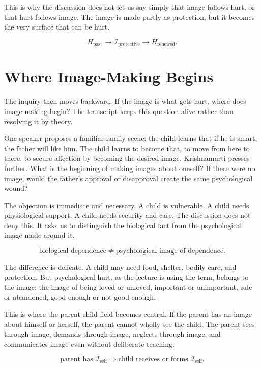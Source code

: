 This is why the discussion does not let us say simply that image follows hurt, or that hurt follows image. The image is made partly as protection, but it becomes the very surface that can be hurt.

\begin{equation}
H_{\text{past}} \to \mathcal{I}_{\text{protective}} \to H_{\text{renewed}}.
\end{equation}

\section{Where Image-Making Begins}

The inquiry then moves backward. If the image is what gets hurt, where does image-making begin? The transcript keeps this question alive rather than resolving it by theory.

One speaker proposes a familiar family scene: the child learns that if he is smart, the father will like him. The child learns to become that, to move from here to there, to secure affection by becoming the desired image. Krishnamurti presses further. What is the beginning of making images about oneself? If there were no image, would the father's approval or disapproval create the same psychological wound?

The objection is immediate and necessary. A child is vulnerable. A child needs physiological support. A child needs security and care. The discussion does not deny this. It asks us to distinguish the biological fact from the psychological image made around it.

\begin{equation}
\text{biological dependence}
\neq
\text{psychological image of dependence}.
\end{equation}

The difference is delicate. A child may need food, shelter, bodily care, and protection. But psychological hurt, as the lecture is using the term, belongs to the image: the image of being loved or unloved, important or unimportant, safe or abandoned, good enough or not good enough.

This is where the parent-child field becomes central. If the parent has an image about himself or herself, the parent cannot wholly see the child. The parent sees through image, demands through image, neglects through image, and communicates image even without deliberate teaching.

\begin{equation}
\text{parent has }\mathcal{I}_{\text{self}}
\Rightarrow
\text{child receives or forms }\mathcal{I}_{\text{self}}.
\end{equation}

